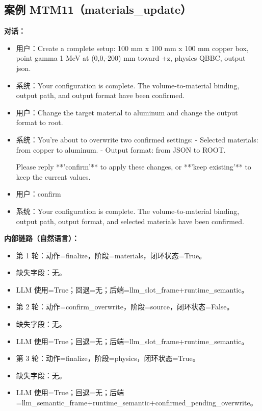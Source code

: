 \documentclass[11pt]{ctexart}
\begin{document}
\subsection{案例 MTM11（materials\_update）}
\textbf{对话：}
\begin{itemize}
\item 用户：Create a complete setup: 100 mm x 100 mm x 100 mm copper box, point gamma 1 MeV at (0,0,-200) mm toward +z, physics QBBC, output json.
\item 系统：Your configuration is complete. The volume-to-material binding, output path, and output format have been confirmed.
\item 用户：Change the target material to aluminum and change the output format to root.
\item 系统：You're about to overwrite two confirmed settings:
- Selected materials: from copper to aluminum.
- Output format: from JSON to ROOT.

Please reply **'confirm'** to apply these changes, or **'keep existing'** to keep the current values.
\item 用户：confirm
\item 系统：Your configuration is complete. The volume-to-material binding, output path, output format, and selected materials have been confirmed.
\end{itemize}
\textbf{内部链路（自然语言）：}
\begin{itemize}
\item 第 1 轮：动作=finalize，阶段=materials，闭环状态=True。
\item 缺失字段：无。
\item LLM 使用=True；回退=无；后端=llm\_slot\_frame+runtime\_semantic。
\item 第 2 轮：动作=confirm\_overwrite，阶段=source，闭环状态=False。
\item 缺失字段：无。
\item LLM 使用=True；回退=无；后端=llm\_slot\_frame+runtime\_semantic。
\item 第 3 轮：动作=finalize，阶段=physics，闭环状态=True。
\item 缺失字段：无。
\item LLM 使用=True；回退=无；后端=llm\_semantic\_frame+runtime\_semantic+confirmed\_pending\_overwrite。
\end{itemize}
\end{document}
